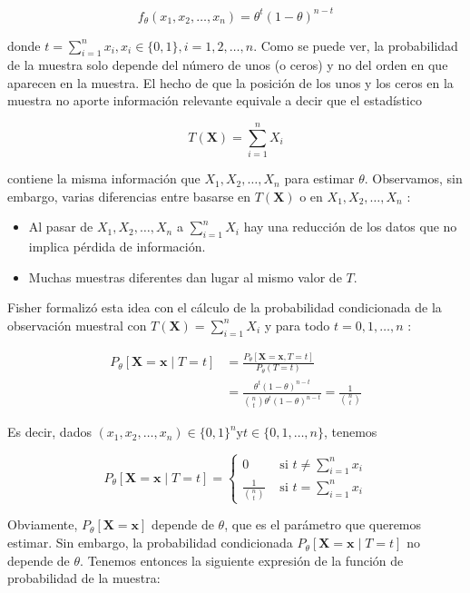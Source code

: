 \documentclass[
]{article}
\providecommand{\tightlist}{%
  \setlength{\itemsep}{0pt}\setlength{\parskip}{0pt}}
\begin{document}
\[
f_{\theta}\left(x_{1}, x_{2}, \ldots, x_{n}\right)=\theta^{t}(1-\theta)^{n-t}
\]

donde \(t=\sum_{i=1}^{n} x_{i}, x_{i} \in\{0,1\}, i=1,2, \ldots, n\).
Como se puede ver, la probabilidad de la muestra solo depende del número de unos (o ceros) y no del orden en que aparecen en la muestra. El hecho de que la posición de los unos y los ceros en la muestra no aporte información relevante equivale a decir que el estadístico

\[
T(\mathbf{X})=\sum_{i=1}^{n} X_{i}
\]

contiene la misma información que \(X_{1}, X_{2}, \ldots, X_{n}\) para estimar \(\theta\). Observamos, sin embargo, varias diferencias entre basarse en \(T(\mathbf{X})\) o en \(X_{1}, X_{2}, \ldots, X_{n}\) :

\begin{itemize}
\tightlist
\item
  Al pasar de \(X_{1}, X_{2}, \ldots, X_{n}\) a \(\sum_{i=1}^{n} X_{i}\) hay una reducción de los datos que no implica pérdida de información.
\item
  Muchas muestras diferentes dan lugar al mismo valor de \(T\).
\end{itemize}

Fisher formalizó esta idea con el cálculo de la probabilidad condicionada de la observación muestral con \(T(\mathbf{X})=\sum_{i=1}^{n} X_{i}\) y para todo \(t=0,1, \ldots, n\) :

\[
\begin{aligned}
P_{\theta}[\mathbf{X}=\mathbf{x} \mid T=t] & =\frac{P_{\theta}[\mathbf{X}=\mathbf{x}, T=t]}{P_{\theta}(T=t)} \\
& =\frac{\theta^{t}(1-\theta)^{n-t}}{\binom{n}{t} \theta^{t}(1-\theta)^{n-t}}=\frac{1}{\binom{n}{t}}
\end{aligned}
\]

Es decir, dados \(\left(x_{1}, x_{2}, \ldots, x_{n}\right) \in\{0,1\}^{n} \mathrm{y} t \in\{0,1, \ldots, n\}\), tenemos

\[
P_{\theta}[\mathbf{X}=\mathbf{x} \mid T=t]=\left\{\begin{array}{cc}
0 & \text { si } t \neq \sum_{i=1}^{n} x_{i} \\
\frac{1}{\binom{n}{t}} & \text { si } t=\sum_{i=1}^{n} x_{i}
\end{array}\right.
\]

Obviamente, \(P_{\theta}[\mathbf{X}=\mathbf{x}]\) depende de \(\theta\), que es el parámetro que queremos estimar. Sin embargo, la probabilidad condicionada \(P_{\theta}[\mathbf{X}=\mathbf{x} \mid T=t]\) no depende de \(\theta\). Tenemos entonces la siguiente expresión de la función de probabilidad de la muestra:
\end{document}
